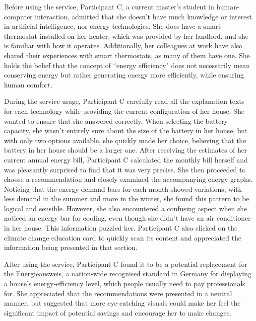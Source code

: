 Before using the service, 
Participant C, a current master's student in human-computer interaction, 
admitted that she doesn't have much knowledge or interest in artificial intelligence, nor energy technologies. 
She does have a smart thermostat installed on her heater, which was provided by her landlord, and she is familiar with how it operates. 
Additionally, her colleagues at work have also shared their experiences with smart thermostats, as many of them have one. 
She holds the belief that the concept of ``energy efficiency" does not necessarily mean conserving energy but rather generating energy more efficiently, while ensuring human comfort.

During the service usage, 
Participant C carefully read all the explanation texts for each technology while providing the current configuration of her house. 
She wanted to ensure that she answered correctly. 
When selecting the battery capacity, she wasn't entirely sure about the size of the battery in her house, but with only two options available, she quickly made her choice, believing that the battery in her house should be a larger one.
After receiving the estimates of her current annual energy bill, Participant C calculated the monthly bill herself and was pleasantly surprised to find that it was very precise. 
She then proceeded to choose a recommendation and closely examined the accompanying energy graphs. 
Noticing that the energy demand bars for each month showed variations, with less demand in the summer and more in the winter, she found this pattern to be logical and sensible.
However, she also encountered a confusing aspect when she noticed an energy bar for cooling, even though she didn't have an air conditioner in her house. This information puzzled her. 
Participant C also clicked on the climate change education card to quickly scan its content and appreciated the information being presented in that section.

After using the service, 
Participant C found it to be a potential replacement for the Energieausweis, a nation-wide recognised standard in Germany for displaying a house's energy-efficiency level, which people usually need to pay professionals for. 
She appreciated that the recommendations were presented in a neutral manner, 
but suggested that more eye-catching visuals could make her feel the significant impact of potential savings and encourage her to make changes.

